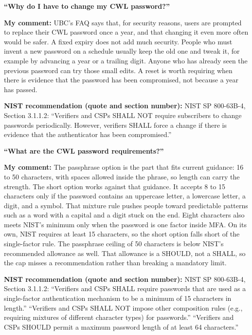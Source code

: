\documentclass[12pt]{article}
\begin{document}
\begin{answer}
    \textbf{``Why do I have to change my CWL password?''}

    \textbf{My comment:}
    UBC's FAQ says that, for security reasons, users are prompted to replace their CWL password once a year, and that changing it even more often would be safer.
    A fixed expiry does not add much security.
    People who must invent a new password on a schedule usually keep the old one and tweak it, for example by advancing a year or a trailing digit.
    Anyone who has already seen the previous password can try those small edits.
    A reset is worth requiring when there is evidence that the password has been compromised, not because a year has passed.

    \textbf{NIST recommendation (quote and section number):}
    NIST SP 800-63B-4, Section 3.1.1.2:
    ``Verifiers and CSPs SHALL NOT require subscribers to change passwords periodically.
    However, verifiers SHALL force a change if there is evidence that the authenticator has been compromised.''

    \bigskip
    \textbf{``What are the CWL password requirements?''}

    \textbf{My comment:}
    The passphrase option is the part that fits current guidance: 16 to 50 characters, with spaces allowed inside the phrase, so length can carry the strength.
    The short option works against that guidance.
    It accepts 8 to 15 characters only if the password contains an uppercase letter, a lowercase letter, a digit, and a symbol.
    That mixture rule pushes people toward predictable patterns such as a word with a capital and a digit stuck on the end.
    Eight characters also meets NIST's minimum only when the password is one factor inside MFA.
    On its own, NIST requires at least 15 characters, so the short option falls short of the single-factor rule.
    The passphrase ceiling of 50 characters is below NIST's recommended allowance as well.
    That allowance is a SHOULD, not a SHALL, so the cap misses a recommendation rather than breaking a mandatory limit.

    \textbf{NIST recommendation (quote and section number):}
    NIST SP 800-63B-4, Section 3.1.1.2:
    ``Verifiers and CSPs SHALL require passwords that are used as a single-factor authentication mechanism to be a minimum of 15 characters in length.''
    ``Verifiers and CSPs SHALL NOT impose other composition rules (e.g., requiring mixtures of different character types) for passwords.''
    ``Verifiers and CSPs SHOULD permit a maximum password length of at least 64 characters.''
\end{answer}
\end{document}
